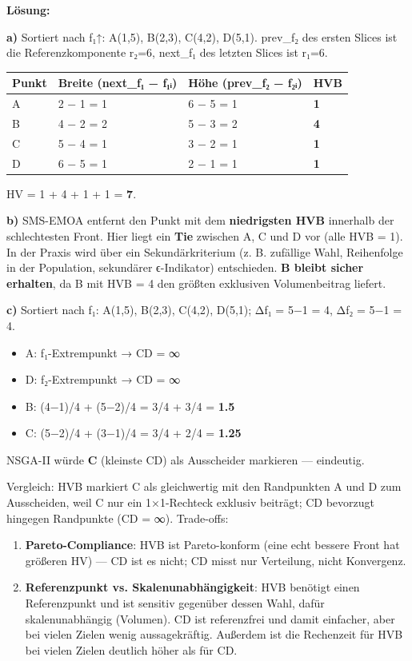 \documentclass[11pt, a4paper]{article}
\begin{document}
\textbf{Lösung:}


\textbf{a)} Sortiert nach f₁↑: A(1,5), B(2,3), C(4,2), D(5,1). prev\_f₂ des ersten Slices ist die Referenzkomponente r₂=6, next\_f₁ des letzten Slices ist r₁=6.



{\small
\begin{tabularx}{\linewidth}{XXXX}
\hline
\rowcolor{tableheadbg}
{\color{white}\textbf{Punkt}} & {\color{white}\textbf{Breite (next\_f₁ − f₁ᵢ)}} & {\color{white}\textbf{Höhe (prev\_f₂ − f₂ᵢ)}} & {\color{white}\textbf{HVB}} \\[2pt]
\hline
\endhead
\hline
\endfoot
A & 2 − 1 = 1 & 6 − 5 = 1 & \textbf{1} \\
B & 4 − 2 = 2 & 5 − 3 = 2 & \textbf{4} \\
C & 5 − 4 = 1 & 3 − 2 = 1 & \textbf{1} \\
D & 6 − 5 = 1 & 2 − 1 = 1 & \textbf{1} \\
\end{tabularx}
}


HV = 1 + 4 + 1 + 1 = \textbf{7}.


\textbf{b)} SMS-EMOA entfernt den Punkt mit dem \textbf{niedrigsten HVB} innerhalb der schlechtesten Front. Hier liegt ein \textbf{Tie} zwischen A, C und D vor (alle HVB = 1). In der Praxis wird über ein Sekundärkriterium (z. B. zufällige Wahl, Reihenfolge in der Population, sekundärer ϵ-Indikator) entschieden. \textbf{B bleibt sicher erhalten}, da B mit HVB = 4 den größten exklusiven Volumenbeitrag liefert.


\textbf{c)} Sortiert nach f₁: A(1,5), B(2,3), C(4,2), D(5,1); Δf₁ = 5−1 = 4, Δf₂ = 5−1 = 4.


\begin{itemize}
  \item A: f₁-Extrempunkt → CD = ∞
  \item D: f₂-Extrempunkt → CD = ∞
  \item B: (4−1)/4 + (5−2)/4 = 3/4 + 3/4 = \textbf{1.5}
  \item C: (5−2)/4 + (3−1)/4 = 3/4 + 2/4 = \textbf{1.25}
\end{itemize}

NSGA-II würde \textbf{C} (kleinste CD) als Ausscheider markieren — eindeutig.


Vergleich: HVB markiert C als gleichwertig mit den Randpunkten A und D zum Ausscheiden, weil C nur ein 1×1-Rechteck exklusiv beiträgt; CD bevorzugt hingegen Randpunkte (CD = ∞). Trade-offs:


\begin{enumerate}
  \item \textbf{Pareto-Compliance}: HVB ist Pareto-konform (eine echt bessere Front hat größeren HV) — CD ist es nicht; CD misst nur Verteilung, nicht Konvergenz.
  \item \textbf{Referenzpunkt vs. Skalenunabhängigkeit}: HVB benötigt einen Referenzpunkt und ist sensitiv gegenüber dessen Wahl, dafür skalenunabhängig (Volumen). CD ist referenzfrei und damit einfacher, aber bei vielen Zielen wenig aussagekräftig. Außerdem ist die Rechenzeit für HVB bei vielen Zielen deutlich höher als für CD.
\end{enumerate}
\end{document}
